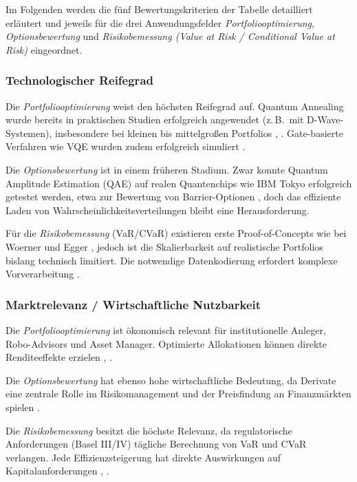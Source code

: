 Im Folgenden werden die fünf Bewertungskriterien der Tabelle detailliert erläutert und jeweils für die drei Anwendungsfelder \textit{Portfoliooptimierung}, \textit{Optionsbewertung} und \textit{Risikobemessung (Value at Risk / Conditional Value at Risk)} eingeordnet.

\subsubsection*{Technologischer Reifegrad}

Die \textit{Portfoliooptimierung} weist den höchsten Reifegrad auf. Quantum Annealing wurde bereits in praktischen Studien erfolgreich angewendet (z.\,B.\ mit D-Wave-Systemen), insbesondere bei kleinen bis mittelgroßen Portfolios \cite[S.~6–7]{rosenberg2016}, \cite[S.~3]{mugel_dynamic_2022}. Gate-basierte Verfahren wie VQE wurden zudem erfolgreich simuliert \cite[S.~8]{egger2020}.

Die \textit{Optionsbewertung} ist in einem früheren Stadium. Zwar konnte Quantum Amplitude Estimation (QAE) auf realen Quantenchips wie IBM Tokyo erfolgreich getestet werden, etwa zur Bewertung von Barrier-Optionen \cite[S.~2–5]{stamatopoulos_option_2020}, doch das effiziente Laden von Wahrscheinlichkeitsverteilungen bleibt eine Herausforderung.

Für die \textit{Risikobemessung} (VaR/CVaR) existieren erste Proof-of-Concepts wie bei Woerner und Egger \cite[S.~6]{orus_quantum_2019}, jedoch ist die Skalierbarkeit auf realistische Portfolios bislang technisch limitiert. Die notwendige Datenkodierung erfordert komplexe Vorverarbeitung \cite[S.~2]{zoufal_quantum_2019}.

\subsubsection*{Marktrelevanz / Wirtschaftliche Nutzbarkeit}

Die \textit{Portfoliooptimierung} ist ökonomisch relevant für institutionelle Anleger, Robo-Advisors und Asset Manager. Optimierte Allokationen können direkte Renditeeffekte erzielen \cite[S.~2]{sakuler_real-world_2025}, \cite[S.~3]{mugel_dynamic_2022}.

Die \textit{Optionsbewertung} hat ebenso hohe wirtschaftliche Bedeutung, da Derivate eine zentrale Rolle im Risikomanagement und der Preisfindung an Finanzmärkten spielen \cite[S.~1]{stamatopoulos_option_2020}.

Die \textit{Risikobemessung} besitzt die höchste Relevanz, da regulatorische Anforderungen (Basel III/IV) tägliche Berechnung von VaR und CVaR verlangen. Jede Effizienzsteigerung hat direkte Auswirkungen auf Kapitalanforderungen \cite[S.~2]{orus_quantum_2019}, \cite[S.~5]{bouland_prospects_2020}.

